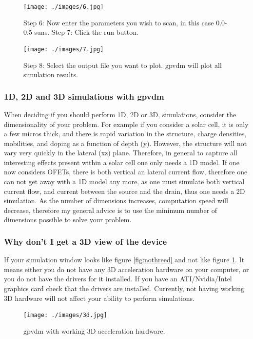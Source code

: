 \begin{figure}[ht!]
\centering
\texttt{[image: ./images/6.jpg]}
\caption*{Step 6: Now enter the parameters you wish to scan, in this case 0.0-0.5 suns.
Step 7: Click the run button.}
\end{figure}


\begin{figure}[ht!]
\centering
\texttt{[image: ./images/7.jpg]}
\caption*{Step 8: Select the output file you want to plot.  gpvdm will plot all simulation results.}
\end{figure}

\subsubsection{1D, 2D and 3D simulations with gpvdm}
When deciding if you should perform 1D, 2D or 3D, simulations, consider the dimensionality of your problem.  For example if you consider a solar cell, it is only a few micros thick, and there is rapid variation in the structure, charge densities, mobilities, and doping as a function of depth (y).  However, the structure will not vary very quickly in the lateral (xz) plane.  Therefore, in general  to capture all interesting effects present within a solar cell one only needs a 1D model.  If one now considers OFETs, there is both vertical an lateral current flow, therefore one can not get away with a 1D model any more, as one must simulate both vertical current flow, and current between the source and the drain, thus one needs a 2D simulation.  As the number of dimensions increases, computation speed will decrease, therefore my general advice is to use the minimum number of dimensions possible to solve your problem.

\subsubsection{Why don't I get a 3D view of the device}
If your simulation window looks like figure \ref{fig:nothreed} and not like figure \ref{fig:threed}.  It means  either you do not have any 3D acceleration hardware on your computer, or you do not have the drivers for it installed.  If you have an ATI/Nvidia/Intel graphics card check that the drivers are installed.  Currently, not having working 3D hardware will not affect your ability to perform simulations.

\begin{figure}[ht!]
\centering
\texttt{[image: ./images/3d.jpg]}
\caption{gpvdm with working 3D acceleration hardware.}
\label{fig:threed}
\end{figure}


